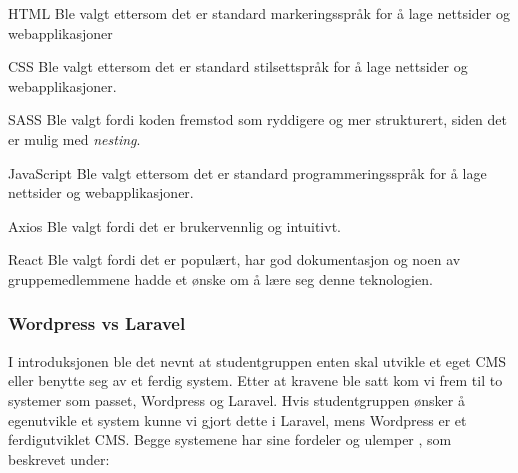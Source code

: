 \begin{compactdesc}
\item[HTML] Ble valgt ettersom det er standard markeringsspråk for å lage nettsider og webapplikasjoner
\item[CSS] Ble valgt ettersom det er standard stilsettspråk for å lage nettsider og webapplikasjoner.
\item[SASS] Ble valgt fordi koden fremstod som ryddigere og mer strukturert, siden det er mulig med \textit{nesting}.
\item[JavaScript] Ble valgt ettersom det er standard programmeringsspråk for å lage nettsider og webapplikasjoner.
\item[Axios] Ble valgt fordi det er brukervennlig og intuitivt.
\item[React] Ble valgt fordi det er populært, har god dokumentasjon og noen av gruppemedlemmene hadde et ønske om å lære seg denne teknologien.
\end{compactdesc}

\subsubsection{Wordpress vs Laravel}
\label{sec:wordpressvslaravel}
I introduksjonen ble det nevnt at studentgruppen enten skal utvikle et eget CMS eller benytte seg av et ferdig system. Etter at kravene ble satt kom vi frem til to systemer som passet, Wordpress og Laravel. Hvis studentgruppen ønsker å egenutvikle et system kunne vi gjort dette i Laravel, mens Wordpress er et ferdigutviklet CMS. Begge systemene har sine fordeler og ulemper \cite{cbcp2019lvw}, som beskrevet under:

